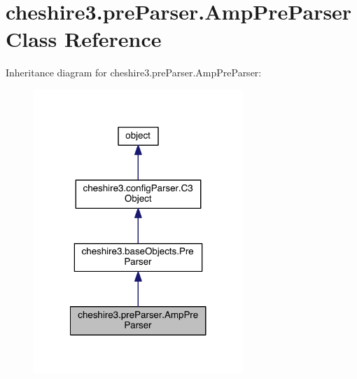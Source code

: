 \hypertarget{classcheshire3_1_1pre_parser_1_1_amp_pre_parser}{\section{cheshire3.\-pre\-Parser.\-Amp\-Pre\-Parser Class Reference}
\label{classcheshire3_1_1pre_parser_1_1_amp_pre_parser}
}


Inheritance diagram for cheshire3.\-pre\-Parser.\-Amp\-Pre\-Parser\-:
\nopagebreak
\begin{figure}[H]
\begin{center}
\leavevmode
\includegraphics[width=224pt]{classcheshire3_1_1pre_parser_1_1_amp_pre_parser__inherit__graph}
\end{center}
\end{figure}


